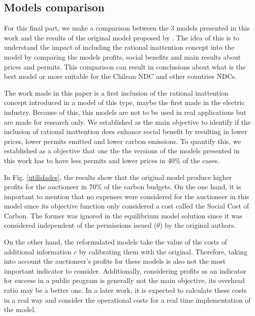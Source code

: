 \documentclass[a4paper,fleqn]{cas-dc}
\begin{document}
\newpage
\subsection{Models comparison}\label{subsec:resultscomparison}

For this final part, we make a comparison between the 3 models presented in this work and the results of the original model proposed by \cite{amigo_two_2021}. The idea of this is to understand the impact of including the rational inattention concept into the model by comparing the models profits, social benefits and main results about prices and permits. This comparison can result in conclusions about what is the best model or more suitable for the Chilean NDC and other countries NDCs.

The work made in this paper is a first inclusion of the rational inattention concept introduced in a model of this type, maybe the first made in the electric industry. Because of this, this models are not to be used in real applications but are made for research only. We established as the main objective to identify if the inclusion of rational inattention does enhance social benefit by resulting in lower prices, lower permits emitted and lower carbon emissions. To quantify this, we established as a objective that one the the versions of the models presented in this work has to have less permits and lower prices in 40\% of the cases.


In Fig. \ref{utilidades}, the results show that the original model produce higher profits for the auctioneer in 70\% of the carbon budgets. On the one hand, it is important to mention that no expenses were considered for the auctioneer in this model since its objective function only considered a cost called the Social Cost of Carbon. The former was ignored in the equilibrium model solution since it was considered independent of the permissions issued ($\theta$) by the original authors.

On the other hand, the reformulated models take the value of the costs of additional information $c$ by calibrating them with the original. Therefore, taking into account the auctioneer's profits for these models is also not the most important indicator to consider. Additionally, considering profits as an indicator for success in a public program is generally not the main objective, its overhead ratio may be a better one. In a later work, it is expected to calculate these costs in a real way and consider the operational costs for a real time implementation of the model.
\end{document}
